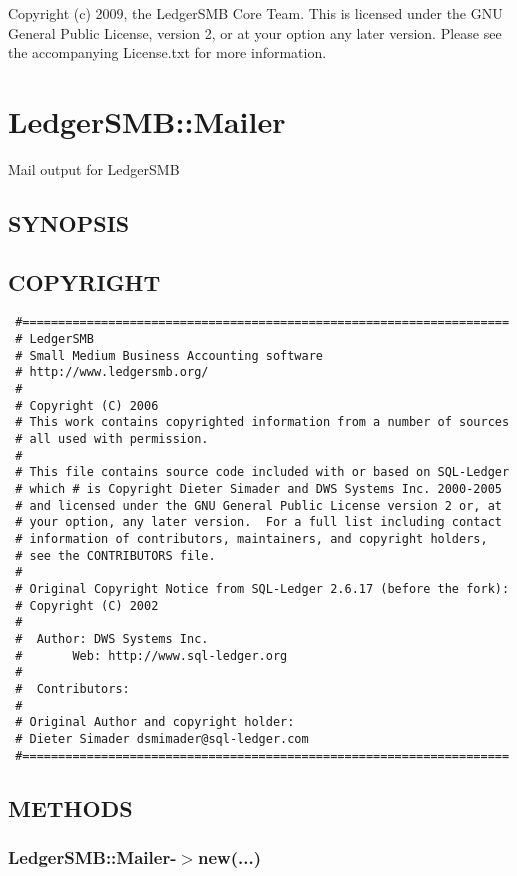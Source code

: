 \begin{description}
\begin{description}
\begin{description}
\begin{description}
\begin{description}
\begin{description}
\begin{description}
\begin{description}
\begin{description}
\begin{description}
Copyright (c) 2009, the LedgerSMB Core Team.  This is licensed under the GNU 
General Public License, version 2, or at your option any later version.  Please 
see the accompanying License.txt for more information.

\section{LedgerSMB::Mailer\label{LedgerSMB::Mailer}}


Mail output for LedgerSMB

\subsection*{SYNOPSIS\label{LedgerSMB::Mailer_SYNOPSIS}}
\subsection*{COPYRIGHT\label{LedgerSMB::Mailer_COPYRIGHT}}
\begin{verbatim}
 #====================================================================
 # LedgerSMB
 # Small Medium Business Accounting software
 # http://www.ledgersmb.org/
 #
 # Copyright (C) 2006
 # This work contains copyrighted information from a number of sources
 # all used with permission.
 #
 # This file contains source code included with or based on SQL-Ledger
 # which # is Copyright Dieter Simader and DWS Systems Inc. 2000-2005
 # and licensed under the GNU General Public License version 2 or, at
 # your option, any later version.  For a full list including contact
 # information of contributors, maintainers, and copyright holders,
 # see the CONTRIBUTORS file.
 #
 # Original Copyright Notice from SQL-Ledger 2.6.17 (before the fork):
 # Copyright (C) 2002
 #
 #  Author: DWS Systems Inc.
 #       Web: http://www.sql-ledger.org
 #
 #  Contributors:
 #
 # Original Author and copyright holder:
 # Dieter Simader dsmimader@sql-ledger.com
 #====================================================================
\end{verbatim}
\subsection*{METHODS\label{LedgerSMB::Mailer_METHODS}}
\subsubsection*{LedgerSMB::Mailer-$>$new(...)\label{LedgerSMB::Mailer_LedgerSMB::Mailer-_new_}}



\end{description}
\end{description}
\end{description}
\end{description}
\end{description}
\end{description}
\end{description}
\end{description}
\end{description}
\end{description}
